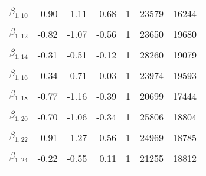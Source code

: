 \begin{table}
\begin{tabular}[t]{lrrrrrr}
$\beta_{1, 10}$ & -0.90 & -1.11 & -0.68 & 1 & 23579 & 16244\\
\cellcolor{gray!6}{$\beta_{1, 11}$} & \cellcolor{gray!6}{-0.64} & \cellcolor{gray!6}{-0.90} & \cellcolor{gray!6}{-0.38} & \cellcolor{gray!6}{1} & \cellcolor{gray!6}{25065} & \cellcolor{gray!6}{17926}\\
$\beta_{1, 12}$ & -0.82 & -1.07 & -0.56 & 1 & 23650 & 19680\\
\cellcolor{gray!6}{$\beta_{1, 13}$} & \cellcolor{gray!6}{-0.51} & \cellcolor{gray!6}{-0.90} & \cellcolor{gray!6}{-0.12} & \cellcolor{gray!6}{1} & \cellcolor{gray!6}{25219} & \cellcolor{gray!6}{19171}\\
$\beta_{1, 14}$ & -0.31 & -0.51 & -0.12 & 1 & 28260 & 19079\\
\cellcolor{gray!6}{$\beta_{1, 15}$} & \cellcolor{gray!6}{-0.73} & \cellcolor{gray!6}{-1.04} & \cellcolor{gray!6}{-0.42} & \cellcolor{gray!6}{1} & \cellcolor{gray!6}{25070} & \cellcolor{gray!6}{19395}\\
$\beta_{1, 16}$ & -0.34 & -0.71 & 0.03 & 1 & 23974 & 19593\\
\cellcolor{gray!6}{$\beta_{1, 17}$} & \cellcolor{gray!6}{-0.68} & \cellcolor{gray!6}{-1.00} & \cellcolor{gray!6}{-0.36} & \cellcolor{gray!6}{1} & \cellcolor{gray!6}{25015} & \cellcolor{gray!6}{19397}\\
$\beta_{1, 18}$ & -0.77 & -1.16 & -0.39 & 1 & 20699 & 17444\\
\cellcolor{gray!6}{$\beta_{1, 19}$} & \cellcolor{gray!6}{-0.12} & \cellcolor{gray!6}{-0.34} & \cellcolor{gray!6}{0.09} & \cellcolor{gray!6}{1} & \cellcolor{gray!6}{22533} & \cellcolor{gray!6}{18234}\\
$\beta_{1, 20}$ & -0.70 & -1.06 & -0.34 & 1 & 25806 & 18804\\
\cellcolor{gray!6}{$\beta_{1, 21}$} & \cellcolor{gray!6}{-0.86} & \cellcolor{gray!6}{-1.17} & \cellcolor{gray!6}{-0.55} & \cellcolor{gray!6}{1} & \cellcolor{gray!6}{22289} & \cellcolor{gray!6}{19219}\\
$\beta_{1, 22}$ & -0.91 & -1.27 & -0.56 & 1 & 24969 & 18785\\
\cellcolor{gray!6}{$\beta_{1, 23}$} & \cellcolor{gray!6}{-0.69} & \cellcolor{gray!6}{-1.00} & \cellcolor{gray!6}{-0.37} & \cellcolor{gray!6}{1} & \cellcolor{gray!6}{28003} & \cellcolor{gray!6}{20604}\\
$\beta_{1, 24}$ & -0.22 & -0.55 & 0.11 & 1 & 21255 & 18812\\
\cellcolor{gray!6}{$\beta_{1, 25}$} & \cellcolor{gray!6}{-0.66} & \cellcolor{gray!6}{-0.95} & \cellcolor{gray!6}{-0.38} & \cellcolor{gray!6}{1} & \cellcolor{gray!6}{30061} & \cellcolor{gray!6}{19000}\\

\end{tabular}
\end{table}
